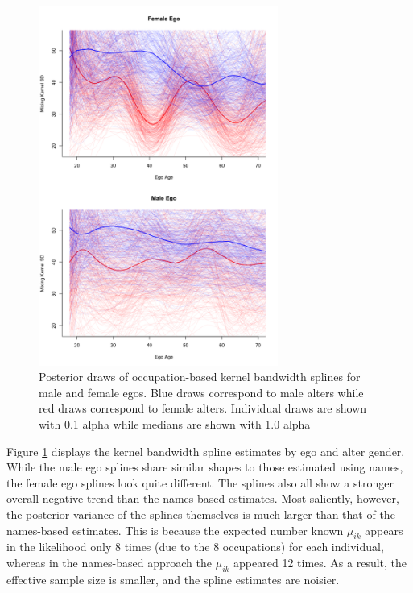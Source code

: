 \begin{figure}
\centering
	\includegraphics[width=0.7\textwidth]{figures/kernel/occs/kern_spline_overlay.png}
\caption{Posterior draws of occupation-based kernel bandwidth splines for male and female egos. Blue draws correspond to male alters while red draws correspond to female alters. Individual draws are shown with 0.1 alpha while medians are shown with 1.0 alpha}
\label{fig:occs_kernel_spline}
\end{figure}

Figure \ref{fig:occs_kernel_spline} displays the kernel bandwidth spline estimates by ego and alter gender. While the male ego splines share similar shapes to those estimated using names, the female ego splines look quite different. The splines also all show a stronger overall negative trend than the names-based estimates. Most saliently, however, the posterior variance of the splines themselves is much larger than that of the names-based estimates. This is because the expected number known $\mu_{ik}$ appears in the likelihood only 8 times (due to the 8 occupations) for each individual, whereas in the names-based approach the $\mu_{ik}$ appeared 12 times. As a result, the effective sample size is smaller, and the spline estimates are noisier. 

